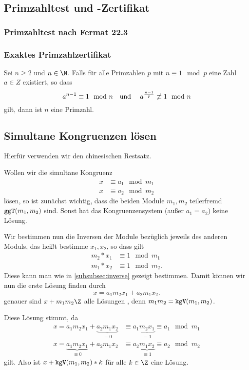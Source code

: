 \subsection{Primzahltest und -Zertifikat}
\subsubsection{Primzahltest nach Fermat 22.3}

\subsubsection{Exaktes Primzahlzertifikat}
Sei $n\geq 2$ und $n\in\N$. Falls für alle Primzahlen $p$ mit $n\equiv 1\mod p$ eine Zahl $a\in Z$ existiert, so dass
\begin{equation*}
 	a^{n-1}\equiv 1\mod n \text{\quad und \quad}a^{\frac{n-1}p}\not\equiv 1\mod n
\end{equation*}
gilt, dann ist $n$ eine Primzahl. 

\subsection{Simultane Kongruenzen lösen}
Hierfür verwenden wir den chinesischen Restsatz.

Wollen wir die simultane Kongruenz 
\begin{align*}
	x&\equiv a_1\mod m_1\\
	x&\equiv a_2\mod m_2
\end{align*}
lösen, so ist zunächst wichtig, dass die beiden Module $m_1,m_2$ teilerfremd $\texttt{ggT}(m_1,m_2)$ sind. Sonst hat das Kongruenzensystem (außer $a_1=a_2$) keine Lösung.

Wir bestimmen nun die Inversen der Module bezüglich jeweils des anderen Moduls, das heißt bestimme $x_1,x_2$, so dass gilt
\begin{align*}
	m_2*x_1&\equiv 1 \mod m_1\\
	m_1*x_2&\equiv 1 \mod m_2.
\end{align*}
Diese kann man wie in \autoref{subsubsec:inverse} gezeigt bestimmen.
Damit können wir nun die erste Lösung finden durch
\begin{equation*}
	x=a_1m_2x_1+a_2m_1x_2.
\end{equation*}
genauer sind $x+m_1m_2\Z$ alle Lösungen , denn $m_1m_2=\texttt{kgV}(m_1,m_2)$.

Diese Lösung stimmt, da
\begin{align*}
	x=a_1m_2x_1+\underbrace{a_2m_1x_2}_{\equiv 0}
	&\equiv a_1\underbrace{m_2x_1}_{\equiv 1}\equiv a_1 \mod m_1\\
	x=\underbrace{a_1m_2x_1}_{\equiv 0}+a_2m_1x_2
	&\equiv a_2\underbrace{m_1x_2}_{\equiv 1} \equiv a_2\mod m_2
\end{align*}
gilt. Also ist $x+\texttt{kgV}(m_1,m_2)*k$ für alle $k\in\Z$ eine Lösung.

